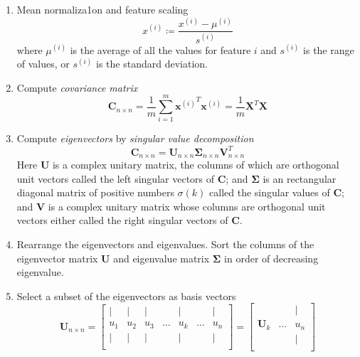 \begin{enumerate}
    \item Mean normaliza1on and feature scaling
    \begin{equation}
        x^{(i)} \coloneqq \frac{x^{(i)}-\mu^{(i)}}{s^{(i)}}
    \end{equation}
    where $\mu^{(i)}$ is the average of all the values for feature $i$ and $s^{(i)}$ is the range of values, or $s^{(i)}$ is the standard deviation.
    
    \item Compute \emph{covariance matrix}
    \begin{equation}
        \mathbf{C}_{n \times n} = \frac{1}{m}\sum_{i=1}^{m}{ {\mathbf{x}^{(i)}}^T \mathbf{x}^{(i)} } = \frac{1}{m}\mathbf{X}^T \mathbf{X}
    \end{equation}
    
    \item Compute \emph{eigenvectors} by \emph{singular value decomposition}
    \begin{equation}
        \mathbf{C}_{n \times n} = \mathbf{U}_{n \times n} \mathbf{\Sigma}_{n \times n} \mathbf{V}^T_{n \times n}
    \end{equation}
    Here $\mathbf{U}$ is a complex unitary matrix, the columns of which are orthogonal unit vectors called the left singular vectors of $\mathbf{C}$; 
    and $\mathbf{\Sigma}$ is an rectangular diagonal matrix of positive numbers $\sigma\left(k\right)$ called the singular values of $\mathbf{C}$; 
    and $\mathbf{V}$ is a complex unitary matrix whose columns are orthogonal unit vectors either called the right singular vectors of $\mathbf{C}$.

    \item Rearrange the eigenvectors and eigenvalues. 
    Sort the columns of the eigenvector matrix $\mathbf{U}$ and eigenvalue matrix $\mathbf{\Sigma}$ in order of decreasing eigenvalue.
    
    \item Select a subset of the eigenvectors as basis vectors
    \begin{equation}
        \mathbf{U}_{n \times n} = 
        \left[\begin{array}{ccccccc}
             |  &  |  &  |  &       &  |  &       &  |  \\ 
            u_1 & u_2 & u_3 & \dots & u_k & \dots & u_n \\
             |  &  |  &  |  &       &  |  &       &  |  \\ 
        \end{array}\right] = 
        \left[\begin{array}{ccc}
                         &       &  |  \\ 
            \mathbf{U}_k & \dots & u_n \\
                         &       &  |  \\ 
        \end{array}\right]
    \end{equation}
    

\end{enumerate}
